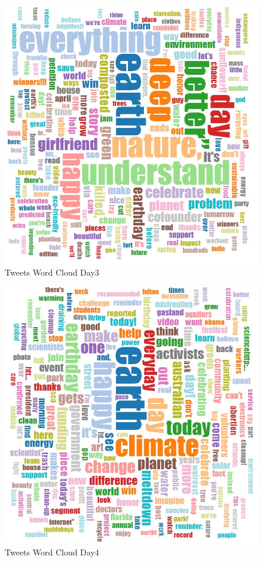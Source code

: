 \begin{figure}[ht]
	\begin{center}
		 \includegraphics[scale=0.90]{wordcloudday3}
		  \caption{Tweets Word Cloud Day3}
	 \end{center}
\end{figure}
\begin{figure}[ht]
	\begin{center}
		 \includegraphics[scale=0.90]{wordcloudday4}
		  \caption{Tweets Word Cloud Day4}
	 \end{center}
\end{figure}
